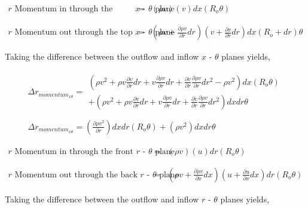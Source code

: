 \begin{displaymath}
	\begin{array}{ccc}
		\textrm{$r$ Momentum in through the bottom $x$ - $\theta$ plane} &
		= & (\rho v)(v)dx(R_o \theta)\\
 		& \\ & \\
		\textrm{$r$ Momentum out through the top $x$ - $\theta$ plane} &
		= & (\rho v + \frac{\partial \rho v}{\partial r}dr)(v + \frac{\partial v}{\partial r}dr)dx
		(R_o + dr) \theta 
	\end{array}
\end{displaymath}


	Taking the difference between the outflow and inflow $x$ - $\theta$ planes yields,

\begin{displaymath}
	\begin{array}{c}
	\Delta r_{momentum_{x \theta}}=
		\begin{array}{c}
	(\rho v^2 + \rho v \frac{\partial v}{\partial r}dr + 
	v \frac{\partial \rho v}{\partial r}dr + \frac{\partial v}{\partial r} \frac{\partial \rho v}{\partial r}dr^2 -
	\rho v^2)dx(R_o \theta) \\
	 + (\rho v^2 + \rho v \frac{\partial v}{\partial r}dr + v \frac{\partial \rho v}{\partial r}dr + 
	\frac{\partial v}{\partial r} \frac{\partial \rho v}{\partial r}dr^2)dxdr \theta
		\end{array} \\ \\
	\Delta r_{momentum_{x \theta}}= (\frac{\partial \rho v^2}{\partial r})dxdr (R_o \theta) + (\rho v^2)dxdr \theta
	\end{array}
\end{displaymath}

\begin{displaymath}
	\begin{array}{ccc}
		\textrm{$r$ Momentum in through the front $r$ - $\theta$ plane} &
		= & (\rho v)(u)dr(R_o \theta)\\
 		& \\ & \\
		\textrm{$r$ Momentum out through the back $r$ - $\theta$ plane} &
		= & (\rho v + \frac{\partial \rho v}{\partial x}dx)(u + \frac{\partial u}{\partial x}dx)dr(R_o \theta) 
	\end{array}
\end{displaymath}

	Taking the difference between the outflow and inflow $r$ - $\theta$ planes yields,

